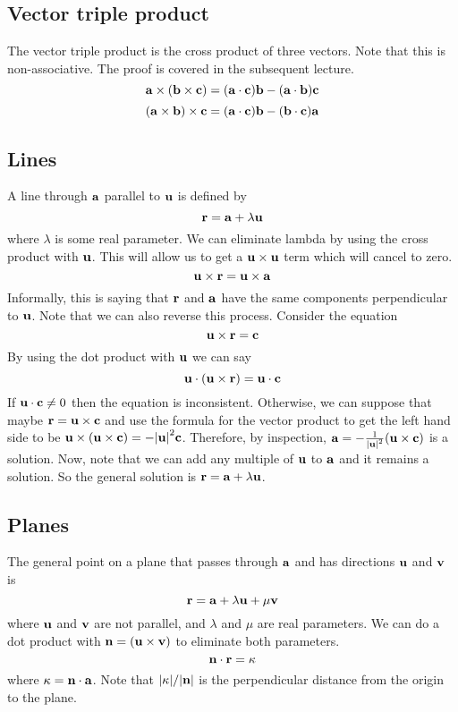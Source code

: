 \subsection{Vector triple product}
The vector triple product is the cross product of three vectors.
Note that this is non-associative.
The proof is covered in the subsequent lecture.
\[
	\vb a \times (\vb b \times \vb c) = (\vb a \cdot \vb c) \vb b - (\vb a\cdot \vb b) \vb c
\]
\[
	(\vb a \times \vb b) \times \vb c = (\vb a \cdot \vb c) \vb b - (\vb b\cdot \vb c) \vb a
\]

\subsection{Lines}
A line through \(\vb a\) parallel to \(\vb u\) is defined by
\[
	\vb r = \vb a + \lambda \vb u
\]
where \(\lambda\) is some real parameter.
We can eliminate lambda by using the cross product with \(\vb u\).
This will allow us to get a \(\vb u \times \vb u\) term which will cancel to zero.
\[
	\vb u \times \vb r = \vb u \times \vb a
\]
Informally, this is saying that \(\vb r\) and \(\vb a\) have the same components perpendicular to \(\vb u\).
Note that we can also reverse this process.
Consider the equation
\[
	\vb u \times \vb r = \vb c
\]
By using the dot product with \(\vb u\) we can say
\[
	\vb u \cdot (\vb u \times \vb r) = \vb u \cdot \vb c
\]
If \(\vb u \cdot \vb c \neq 0\) then the equation is inconsistent.
Otherwise, we can suppose that maybe \(\vb r = \vb u \times \vb c\) and use the formula for the vector product to get the left hand side to be \(\vb u \times (\vb u \times \vb c) = -\abs{\vb u}^2 \vb c\).
Therefore, by inspection, \(\vb a = -\frac{1}{\abs{\vb u}^2}(\vb u \times \vb c)\) is a solution.
Now, note that we can add any multiple of \(\vb u\) to \(\vb a\) and it remains a solution.
So the general solution is \(\vb r = \vb a + \lambda\vb u\).

\subsection{Planes}
The general point on a plane that passes through \(\vb a\) and has directions \(\vb u\) and \(\vb v\) is
\[
	\vb r = \vb a + \lambda \vb u + \mu \vb v
\]
where \(\vb u\) and \(\vb v\) are not parallel, and \(\lambda\) and \(\mu\) are real parameters.
We can do a dot product with \(\vb n = (\vb u \times \vb v)\) to eliminate both parameters.
\[
	\vb n \cdot \vb r = \kappa
\]
where \(\kappa = \vb n \cdot \vb a\).
Note that \(\abs{\kappa}/\abs{\vb n}\) is the perpendicular distance from the origin to the plane.

